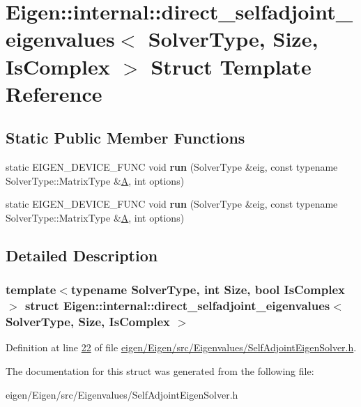 \hypertarget{struct_eigen_1_1internal_1_1direct__selfadjoint__eigenvalues}{}\section{Eigen\+:\+:internal\+:\+:direct\+\_\+selfadjoint\+\_\+eigenvalues$<$ Solver\+Type, Size, Is\+Complex $>$ Struct Template Reference}
\label{struct_eigen_1_1internal_1_1direct__selfadjoint__eigenvalues}
\subsection*{Static Public Member Functions}
\begin{DoxyCompactItemize}
\item 
\mbox{\label{struct_eigen_1_1internal_1_1direct__selfadjoint__eigenvalues_afbde78285f513af91c6f0430f005759a}} 
static E\+I\+G\+E\+N\+\_\+\+D\+E\+V\+I\+C\+E\+\_\+\+F\+U\+NC void {\bfseries run} (Solver\+Type \&eig, const typename Solver\+Type\+::\+Matrix\+Type \&\hyperlink{group___core___module_class_eigen_1_1_matrix}{A}, int options)
\item 
\mbox{\label{struct_eigen_1_1internal_1_1direct__selfadjoint__eigenvalues_afbde78285f513af91c6f0430f005759a}} 
static E\+I\+G\+E\+N\+\_\+\+D\+E\+V\+I\+C\+E\+\_\+\+F\+U\+NC void {\bfseries run} (Solver\+Type \&eig, const typename Solver\+Type\+::\+Matrix\+Type \&\hyperlink{group___core___module_class_eigen_1_1_matrix}{A}, int options)
\end{DoxyCompactItemize}


\subsection{Detailed Description}
\subsubsection*{template$<$typename Solver\+Type, int Size, bool Is\+Complex$>$\newline
struct Eigen\+::internal\+::direct\+\_\+selfadjoint\+\_\+eigenvalues$<$ Solver\+Type, Size, Is\+Complex $>$}



Definition at line \hyperlink{eigen_2_eigen_2src_2_eigenvalues_2_self_adjoint_eigen_solver_8h_source_l00022}{22} of file \hyperlink{eigen_2_eigen_2src_2_eigenvalues_2_self_adjoint_eigen_solver_8h_source}{eigen/\+Eigen/src/\+Eigenvalues/\+Self\+Adjoint\+Eigen\+Solver.\+h}.



The documentation for this struct was generated from the following file\+:\begin{DoxyCompactItemize}
\item 
eigen/\+Eigen/src/\+Eigenvalues/\+Self\+Adjoint\+Eigen\+Solver.\+h\end{DoxyCompactItemize}
